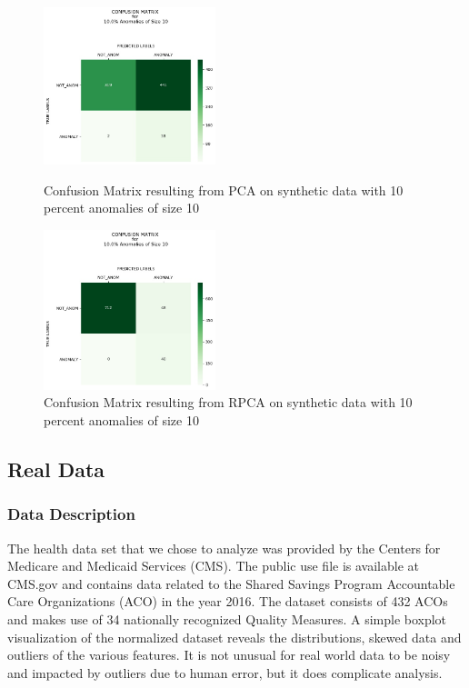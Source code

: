 \documentclass{article}
\begin{document}
\begin{figure}[H]
\begin{minipage}[b]{0.45\linewidth}
    \centering

    \includegraphics[width=50mm, scale=0.5]{cmPCATest_400AnomSize10.jpg}
    \caption{Confusion Matrix resulting from PCA on synthetic data with 10 percent anomalies of size 10}
    \label{fig::CMtrainPCA40010}
\end{minipage}
\quad
\begin{minipage}[b]{0.45\linewidth}
    \centering
    \includegraphics[width=50mm, scale=0.5]{cmRPCATest_400AnomSize10.jpg}
    \caption{Confusion Matrix resulting from RPCA on synthetic data with 10 percent anomalies of size 10}
    \label{fig::CMtrainRPCA40010}
\end{minipage}
\end{figure}


\subsection{Real Data}
\subsubsection{Data Description}

The health data set that we chose to analyze was provided by the Centers for Medicare and Medicaid Services (CMS). The public use file is available at CMS.gov and contains data related to the Shared Savings Program Accountable Care Organizations (ACO) in the year 2016. The dataset consists of 432 ACOs and makes use of 34 nationally recognized Quality Measures.  A simple boxplot visualization of the normalized dataset reveals the distributions, skewed data and outliers of the various features. It is not unusual for real world data to be noisy and impacted by outliers due to human error, but it does complicate analysis.\\
\end{document}

